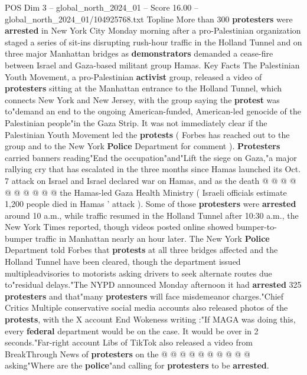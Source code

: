 \begin{textsample}{POS Dim 3 – global\_north\_2024\_01 – Score 16.00 – global\_north\_2024\_01/104925768.txt}  \label{ex:f3_pos_219}
Topline More than 300 \textbf{protesters} were \textbf{arrested} in New York City Monday morning after a pro-Palestinian organization staged a series of sit-ins disrupting rush-hour traffic in the Holland Tunnel and on three major Manhattan bridges as \textbf{demonstrators} demanded a cease-fire between Israel and Gaza-based militant group Hamas.
Key Facts The Palestinian Youth Movement, a pro-Palestinian \textbf{activist} group, released a video of \textbf{protesters} sitting at the Manhattan entrance to the Holland Tunnel, which connects New York and New Jersey, with the group saying the \textbf{protest} was to"demand an end to the ongoing American-funded, American-led genocide of the Palestinian people"in the Gaza Strip.
It was not immediately clear if the Palestinian Youth Movement led the \textbf{protests} ( Forbes has reached out to the group and to the New York \textbf{Police} Department for comment ). \textbf{Protesters} carried banners reading"End the occupation"and"Lift the siege on Gaza,"a major rallying cry that has escalated in the three months since Hamas launched its Oct. 7 attack on Israel and Israel declared war on Hamas, and as the death @ @ @ @ @ @ @ @ @ @ the Hamas-led Gaza Health Ministry ( Israeli officials estimate 1,200 people died in Hamas ' attack ).
Some of those \textbf{protesters} were \textbf{arrested} around 10 a.m., while traffic resumed in the Holland Tunnel after 10:30 a.m., the New York Times reported, though videos posted online showed bumper-to-bumper traffic in Manhattan nearly an hour later.
The New York \textbf{Police} Department told Forbes that \textbf{protests} at all three bridges affected and the Holland Tunnel have been cleared, though the department issued multipleadvisories to motorists asking drivers to seek alternate routes due to"residual delays."The NYPD announced Monday afternoon it had \textbf{arrested} 325 \textbf{protesters} and that"many \textbf{protesters} will face misdemeanor charges."Chief Critics Multiple conservative social media accounts also released photos of the \textbf{protests}, with the X account End Wokeness writing :"If MAGA was doing this, every \textbf{federal} department would be on the case.
It would be over in 2 seconds."Far-right account Libs of TikTok also released a video from BreakThrough News of \textbf{protesters} on the @ @ @ @ @ @ @ @ @ @ asking"Where are the \textbf{police}"and calling for \textbf{protesters} to be \textbf{arrested}.

\end{textsample}
